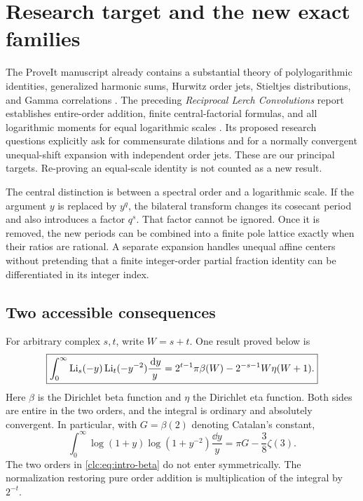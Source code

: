 \section{Research target and the new exact families}
\label{clc:sec:scope}

The ProveIt manuscript already contains a substantial theory of
polylogarithmic identities, generalized harmonic sums, Hurwitz order
jets, Stieltjes distributions, and Gamma correlations \cite{Repo}.
The preceding \emph{Reciprocal Lerch Convolutions} report establishes
entire-order addition, finite central-factorial formulas, and all
logarithmic moments for equal logarithmic scales \cite{RLC}. Its proposed
research questions explicitly ask for commensurate dilations and for a
normally convergent unequal-shift expansion with independent order jets.
These are our principal targets. Re-proving an equal-scale identity is not
counted as a new result.

The central distinction is between a spectral order and a logarithmic
scale. If the argument $y$ is replaced by $y^q$, the bilateral transform
changes its cosecant period and also introduces a factor $q^s$. That
factor cannot be ignored. Once it is removed, the new periods can be
combined into a finite pole lattice exactly when their ratios are rational.
A separate expansion handles unequal affine centers without pretending
that a finite integer-order partial fraction identity can be differentiated
in its integer index.

\subsection{Two accessible consequences}
For arbitrary complex $s,t$, write $W=s+t$. One result proved below is
\begin{equation}\label{clc:eq:intro-beta}
 \boxed{\displaystyle
 \int_0^\infty \operatorname{Li}_s(-y)\operatorname{Li}_t(-y^{-2})\frac{\,\mathrm d y}{y}
 =2^{t-1}\pi\beta(W)-2^{-s-1}W\eta(W+1).}
\end{equation}
Here $\beta$ is the Dirichlet beta function and $\eta$ the Dirichlet eta
function. Both sides are entire in the two orders, and the integral is
ordinary and absolutely convergent. In particular, with
$G=\beta(2)$ denoting Catalan's constant,
\begin{equation}\label{clc:eq:intro-log}
 \int_0^\infty \log(1+y)\log(1+y^{-2})\frac{\dd y}{y}
 =\pi G-\frac38\zeta(3).
\end{equation}
The two orders in \eqref{clc:eq:intro-beta} do not enter symmetrically.
The normalization restoring pure order addition is multiplication of the
integral by $2^{-t}$.


